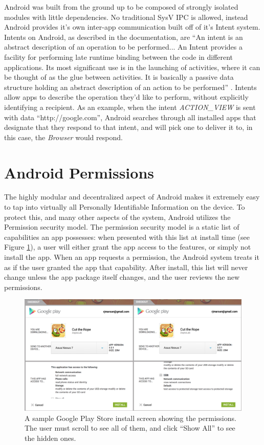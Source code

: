 Android was built from the ground up to be composed of strongly isolated modules with little dependencies. No traditional SysV IPC is allowed, instead Android provides it's own inter-app communication built off of it's Intent system. Intents on Android, as described in the documentation, are ``An intent is an abstract description of an operation to be performed... An Intent provides a facility for performing late runtime binding between the code in different applications. Its most significant use is in the launching of activities, where it can be thought of as the glue between activities. It is basically a passive data structure holding an abstract description of an action to be performed'' \citep{androidintents}. Intents allow apps to describe the operation they'd like to perform, without explicitly identifying a recipient. As an example, when the intent \textit{ACTION\_VIEW} is sent with data ``http://google.com'', Android searches through all installed apps that designate that they respond to that intent, and will pick one to deliver it to, in this case, the \textit{Browser} would respond.

\section{Android Permissions}
The highly modular and decentralized aspect of Android makes it extremely easy to tap into virtually all Personally Identifiable Information on the device. To protect this, and many other aspects of the system, Android utilizes the Permission security model. The permission security model is a static list of capabilities an app possesses: when presented with this list at install time (see Figure \ref{fig:gpstorepermissions}), a user will either grant the app access to the features, or simply not install the app. When an app requests a permission, the Android system treats it as if the user granted the app that capability. After install, this list will never change unless the app package itself changes, and the user reviews the new permissions.

\begin{figure}[h]
\begin{center}
\includegraphics[width=1.0\columnwidth]{figs/GPStoreInstallScreen}
\caption{A sample Google Play Store install screen showing the permissions. The user must scroll to see all of them, and click ``Show All'' to see the hidden ones.}
\label{fig:gpstorepermissions}
\end{center}
\end{figure}

